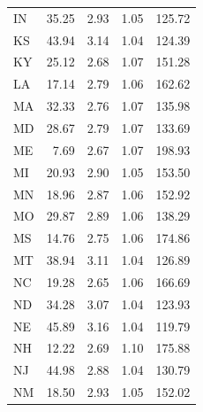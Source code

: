 \documentclass[11pt]{article}
\begin{document}
\begin{multicols}{2}
\begin{table}[htbp]
\begin{tabular}{ l r r r r }
	IN    & 35.25                       & 2.93                 & 1.05         & 125.72                    \\
	KS    & 43.94                       & 3.14                 & 1.04         & 124.39                    \\
	KY    & 25.12                       & 2.68                 & 1.07         & 151.28                    \\
	LA    & 17.14                       & 2.79                 & 1.06         & 162.62                    \\
	MA    & 32.33                       & 2.76                 & 1.07         & 135.98                    \\
	MD    & 28.67                       & 2.79                 & 1.07         & 133.69                    \\
	ME    &  7.69                       & 2.67                 & 1.07         & 198.93                    \\
	MI    & 20.93                       & 2.90                 & 1.05         & 153.50                    \\
	MN    & 18.96                       & 2.87                 & 1.06         & 152.92                    \\
	MO    & 29.87                       & 2.89                 & 1.06         & 138.29                    \\
	MS    & 14.76                       & 2.75                 & 1.06         & 174.86                    \\
	MT    & 38.94                       & 3.11                 & 1.04         & 126.89                    \\
	NC    & 19.28                       & 2.65                 & 1.06         & 166.69                    \\
	ND    & 34.28                       & 3.07                 & 1.04         & 123.93                    \\
	NE    & 45.89                       & 3.16                 & 1.04         & 119.79                    \\
	NH    & 12.22                       & 2.69                 & 1.10         & 175.88                    \\
	NJ    & 44.98                       & 2.88                 & 1.04         & 130.79                    \\
	NM    & 18.50                       & 2.93                 & 1.05         & 152.02                    \\

\end{tabular}
\end{table}
\end{multicols}
\end{document}
